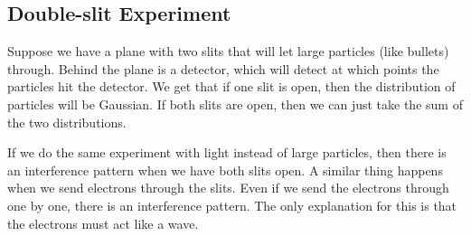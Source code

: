 \documentclass{scrartcl}
\begin{document}
\subsection{Double-slit Experiment}
Suppose we have a plane with two slits that will let large particles (like bullets) through. Behind the plane is a detector, which will detect at which points the particles hit the detector. We get that if one slit is open, then the distribution of particles will be Gaussian. If both slits are open, then we can just take the sum of the two distributions.

If we do the same experiment with light instead of large particles, then there is an interference pattern when we have both slits open. A similar thing happens when we send electrons through the slits. Even if we send the electrons through one by one, there is an interference pattern. The only explanation for this is that the electrons must act like a wave.

\end{document}
